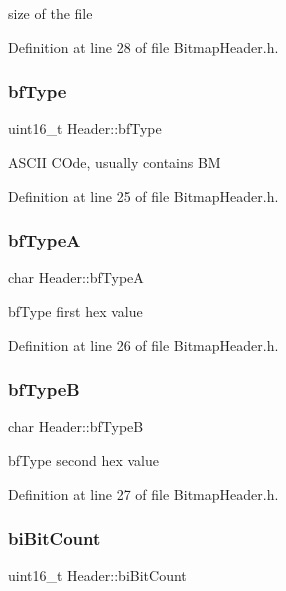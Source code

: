 size of the file 

Definition at line 28 of file Bitmap\+Header.\+h.

\mbox{\label{structHeader_a9d40c794c46d671f006974632a24834d}} 
\subsubsection{\texorpdfstring{bfType}{bfType}}
{\footnotesize\ttfamily uint16\+\_\+t Header\+::bf\+Type}

A\+S\+C\+II C\+Ode, usually contains BM 

Definition at line 25 of file Bitmap\+Header.\+h.

\mbox{\label{structHeader_a470bee676e10a55f7f65c04aa18d34c8}} 
\subsubsection{\texorpdfstring{bfTypeA}{bfTypeA}}
{\footnotesize\ttfamily char Header\+::bf\+TypeA}

bf\+Type first hex value 

Definition at line 26 of file Bitmap\+Header.\+h.

\mbox{\label{structHeader_a9a949e94cf003232940b7d9b10b5c263}} 
\subsubsection{\texorpdfstring{bfTypeB}{bfTypeB}}
{\footnotesize\ttfamily char Header\+::bf\+TypeB}

bf\+Type second hex value 

Definition at line 27 of file Bitmap\+Header.\+h.

\mbox{\label{structHeader_a4e5d3f9ede3980246fe21698bd838158}} 
\subsubsection{\texorpdfstring{biBitCount}{biBitCount}}
{\footnotesize\ttfamily uint16\+\_\+t Header\+::bi\+Bit\+Count}

